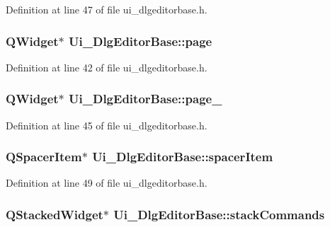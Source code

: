Definition at line 47 of file ui\+\_\+dlgeditorbase.\+h.

\hypertarget{classUi__DlgEditorBase_af3b7d22dff970a6addbde47573ff7266}{
\subsubsection[{page}]{\setlength{\rightskip}{0pt plus 5cm}Q\+Widget$\ast$ Ui\+\_\+\+Dlg\+Editor\+Base\+::page}}\label{classUi__DlgEditorBase_af3b7d22dff970a6addbde47573ff7266}


Definition at line 42 of file ui\+\_\+dlgeditorbase.\+h.

\hypertarget{classUi__DlgEditorBase_a1fd95e634b45303a8580b0eca4673f10}{
\subsubsection[{page\+\_\+2}]{\setlength{\rightskip}{0pt plus 5cm}Q\+Widget$\ast$ Ui\+\_\+\+Dlg\+Editor\+Base\+::page\+\_}}\label{classUi__DlgEditorBase_a1fd95e634b45303a8580b0eca4673f10}


Definition at line 45 of file ui\+\_\+dlgeditorbase.\+h.

\hypertarget{classUi__DlgEditorBase_a7bd5cb1eceba6fb9806f259a2b3c0a5c}{
\subsubsection[{spacer\+Item}]{\setlength{\rightskip}{0pt plus 5cm}Q\+Spacer\+Item$\ast$ Ui\+\_\+\+Dlg\+Editor\+Base\+::spacer\+Item}}\label{classUi__DlgEditorBase_a7bd5cb1eceba6fb9806f259a2b3c0a5c}


Definition at line 49 of file ui\+\_\+dlgeditorbase.\+h.

\hypertarget{classUi__DlgEditorBase_ac8d26dfb80345007e7902493c10381bc}{
\subsubsection[{stack\+Commands}]{\setlength{\rightskip}{0pt plus 5cm}Q\+Stacked\+Widget$\ast$ Ui\+\_\+\+Dlg\+Editor\+Base\+::stack\+Commands}}\label{classUi__DlgEditorBase_ac8d26dfb80345007e7902493c10381bc}



